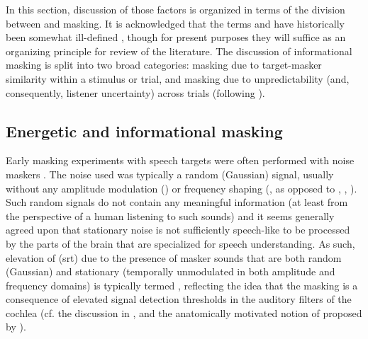 In this section, discussion of those factors is organized in terms of the division between  and  masking.  It is acknowledged that the terms  and  have historically been somewhat ill-defined \citep[cf. discussions in][]{DurlachEtAl2003a, Watson2005}, though for present purposes they will suffice as an organizing principle for review of the literature.  The discussion of informational masking is split into two broad categories: masking due to target-masker similarity within a stimulus or trial, and masking due to unpredictability (and, consequently, listener uncertainty) across trials (following \citealt{KiddEtAl2002} \etseq).  

\subsection{Energetic and informational masking\label{sec:InfoMasking}}
Early masking experiments with speech targets were often performed with noise maskers \citep[\eg][]{HawkinsStevens1950,Tolhurst1957b,PollackPickett1958}.  The noise used was typically a random (Gaussian) signal, usually without any amplitude modulation () or frequency shaping (, as opposed to , , \etc).  Such random signals do not contain any meaningful information (at least from the perspective of a human listening to such sounds) and it seems generally agreed upon that stationary noise is not sufficiently speech-like to be processed by the parts of the brain that are specialized for speech understanding.  As such, elevation of  (\ac{srt}) due to the presence of masker sounds that are both random (Gaussian) and stationary (temporally unmodulated in both amplitude and frequency domains) is typically termed , reflecting the idea that the masking is a consequence of elevated signal detection thresholds in the auditory filters of the cochlea (cf. the discussion in \citealt[96–97]{Moore2008}, and the anatomically motivated notion of  proposed by \citealt{DurlachEtAl2003a}).  

